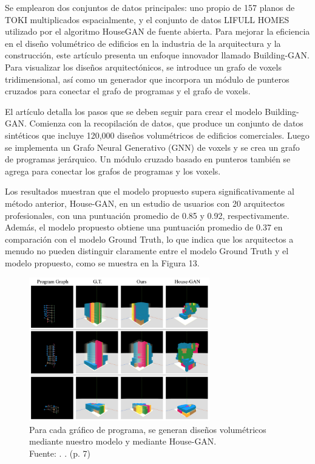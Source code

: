 Se emplearon dos conjuntos de datos principales: uno propio de 157 planos de TOKI multiplicados espacialmente, y el conjunto de datos LIFULL HOMES utilizado por el algoritmo HouseGAN de fuente abierta. Para mejorar la eficiencia en el diseño volumétrico de edificios en la industria de la arquitectura y la construcción, este artículo presenta un enfoque innovador llamado Building-GAN. Para visualizar los diseños arquitectónicos, se introduce un grafo de voxels tridimensional, así como un generador que incorpora un módulo de punteros cruzados para conectar el grafo de programas y el grafo de voxels.

El artículo detalla los pasos que se deben seguir para crear el modelo Building-GAN. Comienza con la recopilación de datos, que produce un conjunto de datos sintéticos que incluye 120,000 diseños volumétricos de edificios comerciales. Luego se implementa un Grafo Neural Generativo (GNN) de voxels y se crea un grafo de programas jerárquico. Un módulo cruzado basado en punteros también se agrega para conectar los grafos de programas y los voxels.

Los resultados muestran que el modelo propuesto supera significativamente al método anterior, House-GAN, en un estudio de usuarios con 20 arquitectos profesionales, con una puntuación promedio de 0.85 y 0.92, respectivamente. Además, el modelo propuesto obtiene una puntuación promedio de 0.37 en comparación con el modelo Ground Truth, lo que indica que los arquitectos a menudo no pueden distinguir claramente entre el modelo Ground Truth y el modelo propuesto, como se muestra en la Figura 13.

\begin{figure}[!ht]
	\begin{center}
		\includegraphics[width=0.7\textwidth]{2/figures/chang2021.png}
		\caption[Para cada gráfico de programa, se generan diseños volumétricos mediante nuestro modelo y mediante House-GAN]{Para cada gráfico de programa, se generan diseños volumétricos mediante nuestro modelo y mediante House-GAN.\\
		Fuente: \cite{pr_chang2021buildinggan}. . (p. 7)}
		\label{2:fig121}
	\end{center}
\end{figure}

